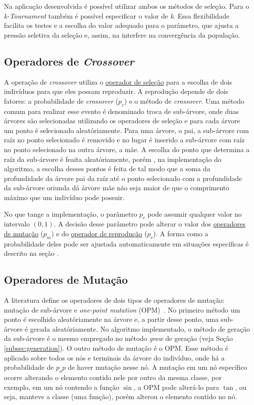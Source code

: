 \documentclass[a4paper]{article}
\begin{document}
Na aplicação desenvolvida é possível utilizar ambos os métodos de seleção. Para
o \textit{k-Tournament} também é possível especificar o valor de \textit{k}.
Essa flexibilidade facilita os testes e a escolha do valor adequado para o
parâmetro, que ajusta a pressão seletiva da seleção e, assim, na interfere na
convergência da população.

\subsection{Operadores de \textit{Crossover}} \label{subsec:crossover}

A operação de \textit{crossover} utiliza o \hyperref[subsec:selection]{operador
  de seleção} para a escolha de dois indivíduos para que eles possam
reproduzir. A reprodução depende de dois fatores: a probabilidade de
\textit{crossover} ($p_c$) e o método de \textit{crossover}.  Uma método comum
para realizar esse evento é denominado troca de sub-árvore, onde duas árvores
são selecionadas utilizando os operadores de seleção e para cada árvore um ponto
é selecionado aleatóriamente. Para uma árvore, o pai, a sub-árvore com raíz no
ponto selecionado é removido e no lugar é inserido a sub-árvore com raíz no
ponto selecionado na outra árvore, a mãe. A escolha do ponto que determina a
raíz da sub-árvore é feaita aleatóriamente, porém , na implementação do
algoritmo, a escolha desses pontos é feita de tal modo que a soma da
profundidade da árvore pai da raíz até o ponto selecionado com a profundidade da
sub-árvore oriunda dá árvore mãe não seja maior de que o comprimento máximo que
um indivíduo pode possuir.

No que tange a implementação, o parâmetro $p_c$ pode assumir qualquer valor no
intervalo $(0, 1)$. A decisão desse parâmetro pode alterar o valor dos
\hyperref[subsec:mutation]{operadores de mutação} ($p_m$) e do
\hyperref[subsec:reproduction]{operador de reprodução} ($p_r$). A forma como a
probabilidade deles pode ser ajustada automaticamente em situações específicas é
descrito na seção .

\subsection{Operadores de Mutação} \label{subsec:mutation}

A literatura define os operadores de dois tipos de operadores de mutação:
mutação de sub-árvore e \textit{one-point mutation} (OPM)~\citep{poli2008}. No
primeiro método um ponto é escolhido aleatóriamente na árvore e, a partir desse
ponto, uma sub-árvore é gerada aleatóriamente. No algoritmo implementado, o
método de geração da sub-árvore é o mesmo empregado no método \textit{grow} de
geração (veja Seção \ref{subsec:generation}). O outro método de mutação é o
OPM. Esse método é aplicado sobre todos os nós e terminais da árvore do
indivíduo, onde há a probabilidade de $p_op$ de haver mutação nesse nó. A
mutação em um nó específico ocorre alterando o elemento contido nele por outro
da mesma classe, por exemplo, em um nó contendo a função $\sin$, a OPM pode
alterá-lo para $\tan$, ou seja, manteve a classe (uma função), porém alterou o
elemento contido no nó.
\end{document}
